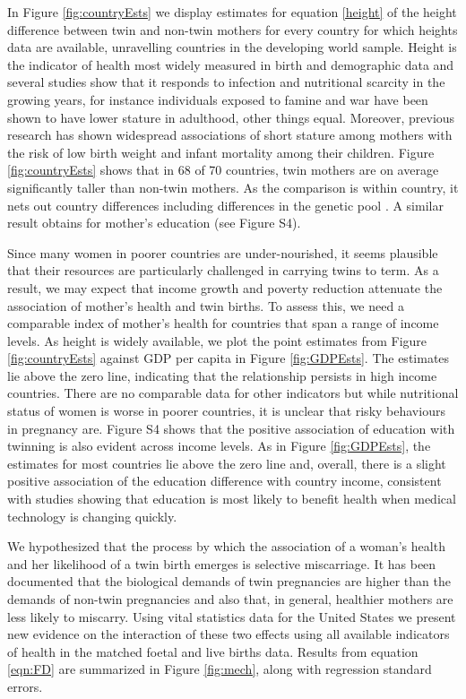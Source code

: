 \documentclass[11pt]{article}
\begin{document}
In Figure \ref{fig:countryEsts} we display estimates for equation \ref{height} of the height difference between twin and non-twin mothers for every country for which heights data are available, unravelling countries in the developing world sample. Height is the indicator of health most widely measured in birth and demographic data and several studies show that it responds to infection and nutritional scarcity in the growing years, for instance individuals exposed to famine and war have been shown to have lower stature in adulthood, other things equal\cite{Silventoinen2003,Bozzolietal2009,Wangetal2010,Akreshetal2012}. Moreover, previous research has shown widespread associations of short stature among mothers with the risk of low birth weight and infant mortality among their children\cite{BhalotraRawlings2013}.  Figure \ref{fig:countryEsts} shows that in 68 of 70 countries, twin mothers are on average significantly taller than non-twin mothers. As the comparison is within country, it nets out country differences including differences in the genetic pool \cite{Deaton2007}. A similar result obtains for mother's education\cite{Kenkel1991,CutlerLlerasMuney2010} (see Figure S4).

Since many women in poorer countries are under-nourished, it seems plausible that their resources are particularly challenged in carrying twins to term. As a result, we may expect that income growth and poverty reduction attenuate the association of mother's health and twin births. To assess this, we need a comparable index of mother's health for countries that span a range of income levels. As height is widely available, we plot the point estimates from Figure \ref{fig:countryEsts} against GDP per capita in Figure \ref{fig:GDPEsts}. The estimates lie above the zero line, indicating that the relationship persists in high income countries. There are no comparable data for other indicators but while nutritional status of women is worse in poorer countries, it is unclear that risky behaviours in pregnancy are.  Figure S4 shows that the positive association of education with twinning is also evident across income levels. As in Figure \ref{fig:GDPEsts}, the estimates for most countries lie above the zero line and, overall, there is a slight positive association of the education difference with country income, consistent with studies showing that education is most likely to benefit health when medical technology is changing quickly\cite{LlerasMuneyGlied2008}.

We hypothesized that the process by which the association of a woman's health and her likelihood of a twin birth emerges is selective miscarriage. It has been documented that the biological demands of twin pregnancies are higher than the demands of non-twin pregnancies\cite{Shinagawaetal2005,Kahnetal2003} and also that, in general, healthier mothers are less likely to miscarry\cite{Garciaetal2002}. Using vital statistics data for the United States we present new evidence on the interaction of these two effects using all available indicators of health in the matched foetal and live births data.  Results from equation \ref{eqn:FD} are summarized in Figure \ref{fig:mech}, along with regression standard errors. 
\end{document}
